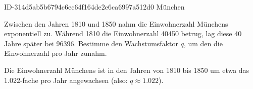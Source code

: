 \begin{exercise}
      {ID-314d5ab5b6794c6ec64f164de2e6ca6997a512d0}
      {München}
  \ifproblem\problem\par
    Zwischen den Jahren 1810 und 1850 nahm die Einwohnerzahl Münchens
    exponentiell zu. Während 1810 die Einwohnerzahl \num{40450} betrug,
    lag diese 40 Jahre später bei \num{96396}. Bestimme den Wachstumsfaktor
    $q$, um den die Einwohnerzahl pro Jahr zunahm.
  \fi
  \ifoutcome\outcome\par
    Die Einwohnerzahl Münchens ist in den Jahren von 1810 bis
    1850 um etwa das \num{1.022}-fache pro Jahr angewachsen
    (also: $q\approx\num{1.022}$).
  \fi
\end{exercise}
